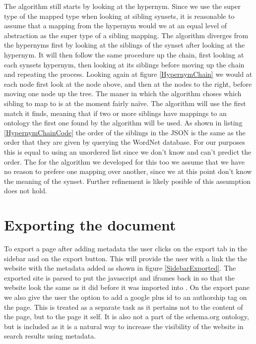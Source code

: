 The algorithm still starts by looking at the hypernym.
Since we use the super type of the mapped type when looking at sibling synsets,
it is reasonable to assume that a mapping from the hypernym would we at an equal level of abstraction as the
super type of a sibling mapping.
The algorithm diverges from the hypernyms first by looking at the siblings of the synset after looking at the hypernym.
It will then follow the same procedure up the chain, first looking at each synsets hypernym,
then looking at its siblings before moving up the chain and repeating the process.
Looking again at figure \ref{HypernymChain} we would at each node first look at the node above,
and then at the nodes to the right, before moving one node up the tree.
The maner in which the algorithm choses which sibling to map to is at the moment fairly naïve.
The algorithm will use the first match it finds,
meaning that if two or more siblings have mappings to an ontology the first one found by the algorithm will be used.
As shown in listing \ref{HypernymChainCode} the order of the siblings in the JSON is the same as the order that they
are given by querying the WordNet database.
For our purposes this is equal to using an unordered list since we don't know and can't predict the order.
The for the algorithm we developed for this too we assume  that we have no reason to prefere one mapping over another,
since we at this point don't know the meaning of the synset.
Further refinement is likely posible of this assumption does not hold.

\section{Exporting the document}
To export a page after adding metadata the user clicks on the export tab in the sidebar and on the export button.
This will provide the user with a link the the website with the metadata added as shown in figure \ref{SidebarExported}.
The exported site is parsed to put the javascript and iframes back in so that the website look the same as it did
before it was imported into \theartefact.
On the export pane we also give the user the option to add a google plus id to an authorship tag on the page.
This is treated as a separate task as it pertains not to the content of the page, but to the page it self.
It is also not a part of the schema.org ontology, but is included as it is a natural way to increase the visibility of
the website in search results using metadata.

